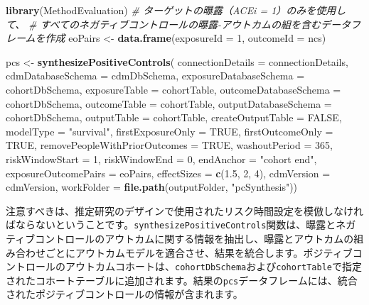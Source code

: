 \documentclass[
  11pt]{book}
\newenvironment{Shaded}{\begin{snugshade}}{\end{snugshade}}
\newcommand{\AttributeTok}[1]{\textcolor[rgb]{0.13,0.29,0.53}{#1}}
\newcommand{\CommentTok}[1]{\textcolor[rgb]{0.56,0.35,0.01}{\textit{#1}}}
\newcommand{\ConstantTok}[1]{\textcolor[rgb]{0.56,0.35,0.01}{#1}}
\newcommand{\DecValTok}[1]{\textcolor[rgb]{0.00,0.00,0.81}{#1}}
\newcommand{\FloatTok}[1]{\textcolor[rgb]{0.00,0.00,0.81}{#1}}
\newcommand{\FunctionTok}[1]{\textcolor[rgb]{0.13,0.29,0.53}{\textbf{#1}}}
\newcommand{\NormalTok}[1]{#1}
\newcommand{\OtherTok}[1]{\textcolor[rgb]{0.56,0.35,0.01}{#1}}
\newcommand{\StringTok}[1]{\textcolor[rgb]{0.31,0.60,0.02}{#1}}
\theoremstyle{definition}
\theoremstyle{definition}
\theoremstyle{definition}
\theoremstyle{definition}
\theoremstyle{remark}
\begin{document}
\begin{Shaded}
\begin{Highlighting}[]
\FunctionTok{library}\NormalTok{(MethodEvaluation)}
\CommentTok{\# ターゲットの曝露（ACEi = 1）のみを使用して、}
\CommentTok{\# すべてのネガティブコントロールの曝露{-}アウトカムの組を含むデータフレームを作成}
\NormalTok{eoPairs }\OtherTok{\textless{}{-}} \FunctionTok{data.frame}\NormalTok{(}\AttributeTok{exposureId =} \DecValTok{1}\NormalTok{,}
                      \AttributeTok{outcomeId =}\NormalTok{ ncs)}

\NormalTok{pcs }\OtherTok{\textless{}{-}} \FunctionTok{synthesizePositiveControls}\NormalTok{(}
  \AttributeTok{connectionDetails =}\NormalTok{ connectionDetails,}
  \AttributeTok{cdmDatabaseSchema =}\NormalTok{ cdmDbSchema,}
  \AttributeTok{exposureDatabaseSchema =}\NormalTok{ cohortDbSchema,}
  \AttributeTok{exposureTable =}\NormalTok{ cohortTable,}
  \AttributeTok{outcomeDatabaseSchema =}\NormalTok{ cohortDbSchema,}
  \AttributeTok{outcomeTable =}\NormalTok{ cohortTable,}
  \AttributeTok{outputDatabaseSchema =}\NormalTok{ cohortDbSchema,}
  \AttributeTok{outputTable =}\NormalTok{ cohortTable,}
  \AttributeTok{createOutputTable =} \ConstantTok{FALSE}\NormalTok{,}
  \AttributeTok{modelType =} \StringTok{"survival"}\NormalTok{,}
  \AttributeTok{firstExposureOnly =} \ConstantTok{TRUE}\NormalTok{,}
  \AttributeTok{firstOutcomeOnly =} \ConstantTok{TRUE}\NormalTok{,}
  \AttributeTok{removePeopleWithPriorOutcomes =} \ConstantTok{TRUE}\NormalTok{,}
  \AttributeTok{washoutPeriod =} \DecValTok{365}\NormalTok{,}
  \AttributeTok{riskWindowStart =} \DecValTok{1}\NormalTok{,}
  \AttributeTok{riskWindowEnd =} \DecValTok{0}\NormalTok{,}
  \AttributeTok{endAnchor =} \StringTok{"cohort end"}\NormalTok{,}
  \AttributeTok{exposureOutcomePairs =}\NormalTok{ eoPairs,}
  \AttributeTok{effectSizes =} \FunctionTok{c}\NormalTok{(}\FloatTok{1.5}\NormalTok{, }\DecValTok{2}\NormalTok{, }\DecValTok{4}\NormalTok{),}
  \AttributeTok{cdmVersion =}\NormalTok{ cdmVersion,}
  \AttributeTok{workFolder =} \FunctionTok{file.path}\NormalTok{(outputFolder, }\StringTok{"pcSynthesis"}\NormalTok{))}
\end{Highlighting}
\end{Shaded}

注意すべきは、推定研究のデザインで使用されたリスク時間設定を模倣しなければならないということです。\texttt{synthesizePositiveControls}関数は、曝露とネガティブコントロールのアウトカムに関する情報を抽出し、曝露とアウトカムの組み合わせごとにアウトカムモデルを適合させ、結果を統合します。ポジティブコントロールのアウトカムコホートは、\texttt{cohortDbSchema}および\texttt{cohortTable}で指定されたコホートテーブルに追加されます。結果の\texttt{pcs}データフレームには、統合されたポジティブコントロールの情報が含まれます。
\end{document}

